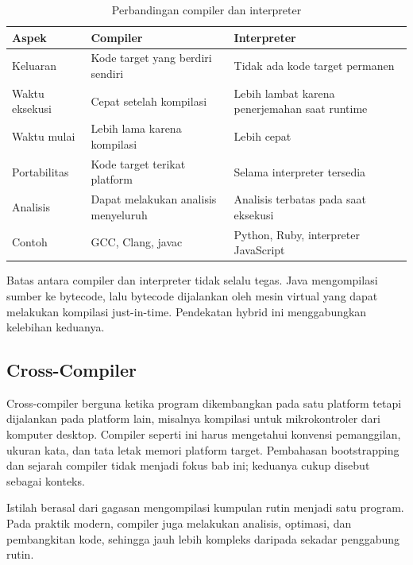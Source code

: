 \begin{table}[H]
\centering
\caption{Perbandingan compiler dan interpreter}
\label{tab:ch03-compiler-interpreter}
\begin{tabularx}{\textwidth}{@{}lXX@{}}
\toprule
\textbf{Aspek} & \textbf{Compiler} & \textbf{Interpreter} \\
\midrule
Keluaran & Kode target yang berdiri sendiri & Tidak ada kode target
permanen \\
Waktu eksekusi & Cepat setelah kompilasi & Lebih lambat karena
penerjemahan saat runtime \\
Waktu mulai & Lebih lama karena kompilasi & Lebih cepat \\
Portabilitas & Kode target terikat platform & Selama interpreter
tersedia \\
Analisis & Dapat melakukan analisis menyeluruh & Analisis terbatas
pada saat eksekusi \\
Contoh & GCC, Clang, javac & Python, Ruby, interpreter JavaScript \\
\bottomrule
\end{tabularx}
\end{table}

Batas antara compiler dan interpreter tidak selalu tegas. Java
mengompilasi sumber ke bytecode, lalu bytecode dijalankan oleh mesin
virtual yang dapat melakukan kompilasi just-in-time. Pendekatan
hybrid ini menggabungkan kelebihan keduanya.

\subsection{Cross-Compiler}

Cross-compiler berguna ketika program dikembangkan pada satu platform
tetapi dijalankan pada platform lain, misalnya kompilasi untuk
mikrokontroler dari komputer desktop. Compiler seperti ini harus
mengetahui konvensi pemanggilan, ukuran kata, dan tata letak memori
platform target. Pembahasan bootstrapping dan sejarah compiler tidak
menjadi fokus bab ini; keduanya cukup disebut sebagai konteks.

\begin{infobox}
Istilah  berasal dari gagasan mengompilasi kumpulan
rutin menjadi satu program. Pada praktik modern, compiler juga
melakukan analisis, optimasi, dan pembangkitan kode, sehingga jauh
lebih kompleks daripada sekadar penggabung rutin.
\end{infobox}
